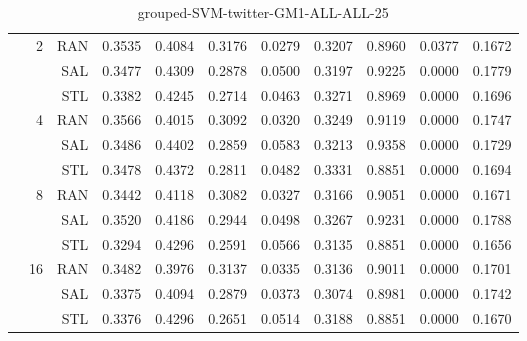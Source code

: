 \begin{center}
\begin{table}[htbp]
\begin{center}
\begin{tabular}{ | r | r | r | r | r | r | r | r | r | r | r |}
 & \multirow{3}{*}{2} & RAN & 0.3535 & 0.4084 & 0.3176 & 0.0279 & 0.3207 & 0.8960 & 0.0377 & 0.1672\\ \cline{3-11}
 &   & SAL & 0.3477 & 0.4309 & 0.2878 & 0.0500 & 0.3197 & 0.9225 & 0.0000 & 0.1779\\ \cline{3-11}
 &   & STL & 0.3382 & 0.4245 & 0.2714 & 0.0463 & 0.3271 & 0.8969 & 0.0000 & 0.1696\\ \cline{2-11}
 & \multirow{3}{*}{4} & RAN & 0.3566 & 0.4015 & 0.3092 & 0.0320 & 0.3249 & 0.9119 & 0.0000 & 0.1747\\ \cline{3-11}
 &   & SAL & 0.3486 & 0.4402 & 0.2859 & 0.0583 & 0.3213 & 0.9358 & 0.0000 & 0.1729\\ \cline{3-11}
 &   & STL & 0.3478 & 0.4372 & 0.2811 & 0.0482 & 0.3331 & 0.8851 & 0.0000 & 0.1694\\ \cline{2-11}
 & \multirow{3}{*}{8} & RAN & 0.3442 & 0.4118 & 0.3082 & 0.0327 & 0.3166 & 0.9051 & 0.0000 & 0.1671\\ \cline{3-11}
 &   & SAL & 0.3520 & 0.4186 & 0.2944 & 0.0498 & 0.3267 & 0.9231 & 0.0000 & 0.1788\\ \cline{3-11}
 &   & STL & 0.3294 & 0.4296 & 0.2591 & 0.0566 & 0.3135 & 0.8851 & 0.0000 & 0.1656\\ \cline{2-11}
 & \multirow{3}{*}{16} & RAN & 0.3482 & 0.3976 & 0.3137 & 0.0335 & 0.3136 & 0.9011 & 0.0000 & 0.1701\\ \cline{3-11}
 &   & SAL & 0.3375 & 0.4094 & 0.2879 & 0.0373 & 0.3074 & 0.8981 & 0.0000 & 0.1742\\ \cline{3-11}
 &   & STL & 0.3376 & 0.4296 & 0.2651 & 0.0514 & 0.3188 & 0.8851 & 0.0000 & 0.1670\\ \cline{2-11}
\hline
\end{tabular}
\caption{grouped-SVM-twitter-GM1-ALL-ALL-25}
\end{center}
 \end{table}
\end{center}

